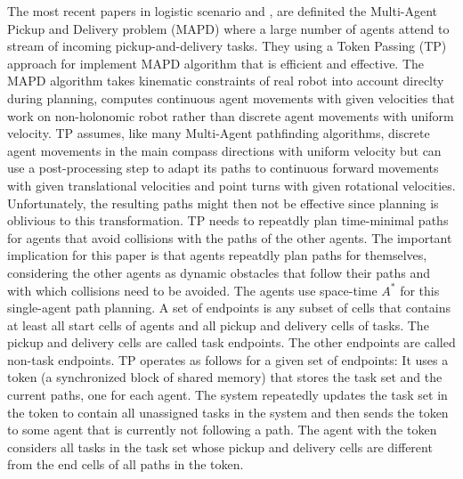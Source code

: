 The most recent papers in logistic scenario \cite{mapf} and \cite{mapd}, are definited 
the Multi-Agent Pickup and Delivery problem (MAPD) where a large number of agents attend to
stream of incoming pickup-and-delivery tasks. They using a Token Passing (TP) approach
for implement MAPD algorithm that is efficient and effective. The MAPD algorithm takes 
kinematic constraints of real robot into account direclty during planning, computes 
continuous agent movements with given velocities that work on non-holonomic robot rather than
discrete agent movements with uniform velocity.
TP assumes, like many Multi-Agent pathfinding algorithms, discrete agent movements 
in the main compass directions with uniform velocity but can use a post-processing step 
to adapt its paths to continuous forward movements with given translational velocities 
and point turns with given rotational velocities. 
Unfortunately, the resulting paths might then not be effective since planning is oblivious 
to this transformation. TP needs to repeatdly plan time-minimal paths for agents 
that avoid collisions with the paths of the other agents. 
The important implication for this paper is that agents repeatdly plan paths for themselves,
considering the other agents as dynamic obstacles that follow their paths and with which 
collisions need to be avoided. The agents use space-time $A^*$ for this single-agent path planning.
A set of endpoints is any subset of cells that contains at least all start cells of agents and all 
pickup and delivery cells of tasks. The pickup and delivery cells are called task endpoints.
The other endpoints are called non-task endpoints.
TP operates as follows for a given set of endpoints: It uses
a token (a synchronized block of shared memory) that stores
the task set and the current paths, one for each agent.
The system repeatedly updates the task set in the token to contain
all unassigned tasks in the system and then sends the token
to some agent that is currently not following a path. The
agent with the token considers all tasks in the task set whose
pickup and delivery cells are different from the end cells of
all paths in the token.

